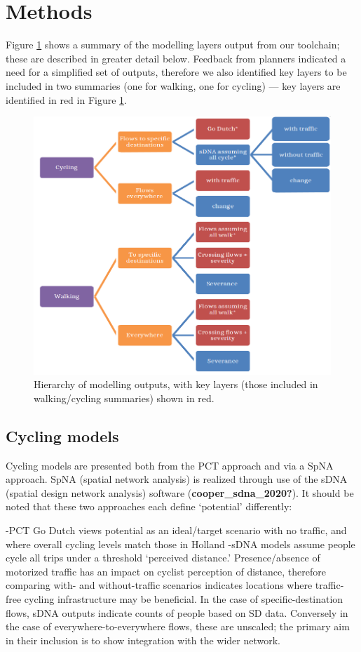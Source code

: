 \documentclass[galley]{jtlu-article-2col}
\begin{document}
\hypertarget{methods}{%
\section{Methods}\label{methods}}

Figure \ref{fig:flowchart} shows a summary of the modelling layers output from our toolchain; these are described in greater detail below.
Feedback from planners indicated a need for a simplified set of outputs, therefore we also identified key layers to be included in two summaries (one for walking, one for cycling) --- key layers are identified in red in Figure \ref{fig:flowchart}.

\begin{figure}

{\centering \includegraphics[width=0.6\linewidth]{figures/flowchart} 

}

\caption{Hierarchy of modelling outputs, with key layers (those included in walking/cycling summaries) shown in red.}\label{fig:flowchart}
\end{figure}

\hypertarget{cycling-models}{%
\subsection{Cycling models}\label{cycling-models}}

Cycling models are presented both from the PCT approach and via a SpNA approach. SpNA (spatial network analysis) is realized through use of the sDNA (spatial design network analysis) software (\textbf{cooper\_sdna\_2020?}).
It should be noted that these two approaches each define `potential' differently:

-PCT Go Dutch views potential as an ideal/target scenario with no traffic, and where overall cycling levels match those in Holland
-sDNA models assume people cycle all trips under a threshold `perceived distance.' Presence/absence of motorized traffic has an impact on cyclist perception of distance, therefore comparing with- and without-traffic scenarios indicates locations where traffic-free cycling infrastructure may be beneficial. In the case of specific-destination flows, sDNA outputs indicate counts of people based on SD data. Conversely in the case of everywhere-to-everywhere flows, these are unscaled; the primary aim in their inclusion is to show integration with the wider network.
\end{document}

